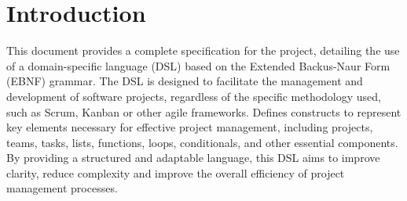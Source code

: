 \section{Introduction}
\label{sec:introduction}
This document provides a complete specification for the project, detailing the use of a domain-specific language (DSL) based on the Extended Backus-Naur Form (EBNF) grammar. The DSL is designed to facilitate the management and development of software projects, regardless of the specific methodology used, such as Scrum, Kanban or other agile frameworks. Defines constructs to represent key elements necessary for effective project management, including projects, teams, tasks, lists, functions, loops, conditionals, and other essential components. By providing a structured and adaptable language, this DSL aims to improve clarity, reduce complexity and improve the overall efficiency of project management processes.

